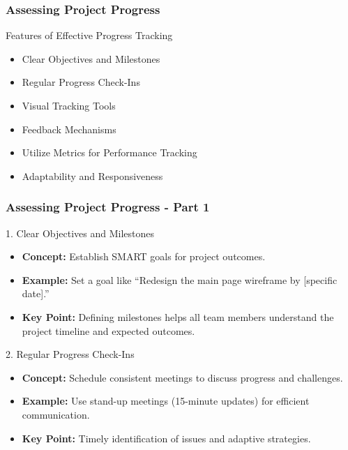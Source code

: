 \documentclass[aspectratio=169]{beamer}
\begin{document}
\begin{frame}[fragile]
    \frametitle{Assessing Project Progress}
    \begin{block}{Features of Effective Progress Tracking}
        \begin{itemize}
            \item Clear Objectives and Milestones
            \item Regular Progress Check-Ins
            \item Visual Tracking Tools
            \item Feedback Mechanisms
            \item Utilize Metrics for Performance Tracking
            \item Adaptability and Responsiveness
        \end{itemize}
    \end{block}
\end{frame}

\begin{frame}[fragile]
    \frametitle{Assessing Project Progress - Part 1}
    \begin{block}{1. Clear Objectives and Milestones}
        \begin{itemize}
            \item \textbf{Concept:} Establish SMART goals for project outcomes.
            \item \textbf{Example:} Set a goal like ``Redesign the main page wireframe by [specific date].''
            \item \textbf{Key Point:} Defining milestones helps all team members understand the project timeline and expected outcomes.
        \end{itemize}
    \end{block}
    
    \begin{block}{2. Regular Progress Check-Ins}
        \begin{itemize}
            \item \textbf{Concept:} Schedule consistent meetings to discuss progress and challenges.
            \item \textbf{Example:} Use stand-up meetings (15-minute updates) for efficient communication.
            \item \textbf{Key Point:} Timely identification of issues and adaptive strategies.
        \end{itemize}
    \end{block}
\end{frame}
\end{document}
